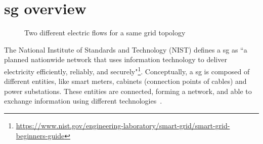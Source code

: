 \section[Smart grid overview]{\Gls{sg} overview}
\label{sec:example:sg}

\begin{figure}[ht]
	\centering
	\hfill
	\caption{Two different electric flows for a same grid topology}
	\label{fig:example:sg-overview:topo}
\end{figure}



The National Institute of Standards and Technology (NIST) defines a \gls{sg} as ``a planned nationwide network that uses information technology to deliver electricity efficiently, reliably, and securely"\footnote{\url{https://www.nist.gov/engineering-laboratory/smart-grid/smart-grid-beginners-guide}}.
Conceptually, a \gls{sg} is composed of different entities, like smart meters, cabinets (connection points of cables) and power substations.
These entities are connected, forming a network, and able to exchange information using different technologies~\cite{DBLP:conf/smartgridcomm/0001FKTPTR14, DBLP:conf/sac/0001MFRKT16}.

